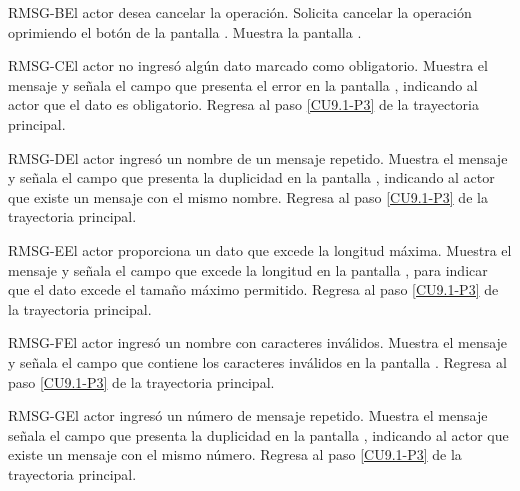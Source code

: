 	\begin{UCtrayectoriaA}{RMSG-B}{El actor desea cancelar la operación.}
		\UCpaso[\UCactor] Solicita cancelar la operación oprimiendo el botón  de la pantalla .
		\UCpaso[\UCsist] Muestra la pantalla .
	\end{UCtrayectoriaA}

	\begin{UCtrayectoriaA}{RMSG-C}{El actor no ingresó algún dato marcado como obligatorio.}
		\UCpaso[\UCsist] Muestra el mensaje  y señala el campo que presenta el error en la pantalla , indicando al actor que el dato es obligatorio.
		\UCpaso Regresa al paso \ref{CU9.1-P3} de la trayectoria principal.
	\end{UCtrayectoriaA}
	
	\begin{UCtrayectoriaA}{RMSG-D}{El actor ingresó un nombre de un mensaje repetido.}
		\UCpaso[\UCsist] Muestra el mensaje  y señala el campo que presenta la duplicidad en la pantalla , indicando al actor que existe un mensaje con el mismo nombre.
		\UCpaso Regresa al paso \ref{CU9.1-P3} de la trayectoria principal.
	\end{UCtrayectoriaA}

	\begin{UCtrayectoriaA}{RMSG-E}{El actor proporciona un dato que excede la longitud máxima.}
		\UCpaso[\UCsist] Muestra el mensaje  y señala el campo que excede la longitud en la pantalla , para indicar que el dato excede el tamaño máximo permitido.
		\UCpaso Regresa al paso \ref{CU9.1-P3} de la trayectoria principal.
	\end{UCtrayectoriaA}

	\begin{UCtrayectoriaA}{RMSG-F}{El actor ingresó un nombre con caracteres inválidos.}
	\UCpaso[\UCsist] Muestra el mensaje  y señala el campo que contiene los caracteres inválidos en la pantalla .
	\UCpaso Regresa al paso \ref{CU9.1-P3} de la trayectoria principal.
	\end{UCtrayectoriaA}

	\begin{UCtrayectoriaA}{RMSG-G}{El actor ingresó un número de mensaje repetido.}
		\UCpaso[\UCsist] Muestra el mensaje  señala el campo que presenta la duplicidad en la pantalla , indicando al actor que existe un mensaje con el mismo número.
		\UCpaso Regresa al paso \ref{CU9.1-P3} de la trayectoria principal.
	\end{UCtrayectoriaA}
